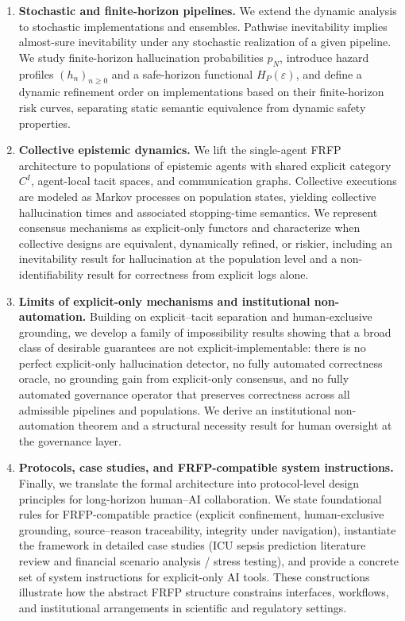 \documentclass[11pt]{article}
\theoremstyle{definition}
\begin{document}
\begin{enumerate}
  \item \textbf{Stochastic and finite-horizon pipelines.}
  We extend the dynamic analysis to stochastic implementations and ensembles. Pathwise inevitability implies almost-sure inevitability under any stochastic realization of a given pipeline. We study finite-horizon hallucination probabilities $p_N$, introduce hazard profiles $(h_n)_{n \ge 0}$ and a safe-horizon functional $H_P(\varepsilon)$, and define a dynamic refinement order on implementations based on their finite-horizon risk curves, separating static semantic equivalence from dynamic safety properties.

  \item \textbf{Collective epistemic dynamics.}
  We lift the single-agent FRFP architecture to populations of epistemic agents with shared explicit category $C^I$, agent-local tacit spaces, and communication graphs. Collective executions are modeled as Markov processes on population states, yielding collective hallucination times and associated stopping-time semantics. We represent consensus mechanisms as explicit-only functors and characterize when collective designs are equivalent, dynamically refined, or riskier, including an inevitability result for hallucination at the population level and a non-identifiability result for correctness from explicit logs alone.

  \item \textbf{Limits of explicit-only mechanisms and institutional non-automation.}
  Building on explicit–tacit separation and human-exclusive grounding, we develop a family of impossibility results showing that a broad class of desirable guarantees are not explicit-implementable: there is no perfect explicit-only hallucination detector, no fully automated correctness oracle, no grounding gain from explicit-only consensus, and no fully automated governance operator that preserves correctness across all admissible pipelines and populations. We derive an institutional non-automation theorem and a structural necessity result for human oversight at the governance layer.

  \item \textbf{Protocols, case studies, and FRFP-compatible system instructions.}
  Finally, we translate the formal architecture into protocol-level design principles for long-horizon human–AI collaboration. We state foundational rules for FRFP-compatible practice (explicit confinement, human-exclusive grounding, source–reason traceability, integrity under navigation), instantiate the framework in detailed case studies (ICU sepsis prediction literature review and financial scenario analysis / stress testing), and provide a concrete set of system instructions for explicit-only AI tools. These constructions illustrate how the abstract FRFP structure constrains interfaces, workflows, and institutional arrangements in scientific and regulatory settings.
\end{enumerate}
\end{document}
